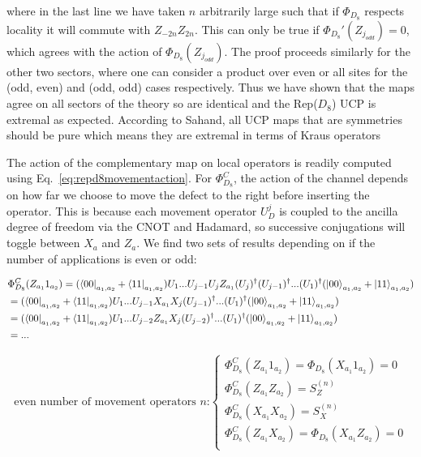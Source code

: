 \documentclass{article}
\theoremstyle{definition}
\begin{document}
where in the last line we have taken $n$ arbitrarily large such that if $\Phi_{D_8}$ respects locality it will commute with $Z_{-2n}Z_{2n}$.  This can only be true if $\Phi_{D_8}'(Z_{j_{odd}}) = 0$, which agrees with the action of $\Phi_{D_8}(Z_{j_{odd}})$.  The proof proceeds similarly for the other two sectors, where one can consider a product over even or all sites for the (odd, even) and (odd, odd) cases respectively.  Thus we have shown that the maps agree on all sectors of the theory so are identical and the Rep($D_8$) UCP is extremal as expected.
\color{brown}
According to Sahand, all UCP maps that are symmetries should be pure which means they are extremal in terms of Kraus operators
\color{black}


The action of the complementary map on local operators is readily computed using Eq.~\ref{eq:repd8movementaction}. For $\Phi^C_{D_8}$, the action of the channel depends on how far we choose to move the defect to the right before inserting the operator.  This is because each movement operator $U^j_{D}$ is coupled to the ancilla degree of freedom via the CNOT and Hadamard, so successive conjugations will toggle between $X_a$ and $Z_a$. We find two sets of results depending on if the number of applications is even or odd:

\color{blue}
\begin{align}
    &\Phi^C_{D_8}(Z_{a_1}1_{a_2}) = (\bra{00}_{a_1,a_2} + \bra{11}_{a_1,a_2}) U_1 ... U_{j-1} U_j Z_{a_1} (U_j)^\dagger (U_{j-1})^\dagger ... (U_{1})^\dagger (\ket{00}_{a_1,a_2} + \ket{11}_{a_1,a_2})\\
    &= (\bra{00}_{a_1,a_2} + \bra{11}_{a_1,a_2}) U_1 ...U_{j-1} X_{a_1}X_j (U_{j-1})^\dagger ... (U_{1})^\dagger (\ket{00}_{a_1,a_2} + \ket{11}_{a_1,a_2})\\
    &=  (\bra{00}_{a_1,a_2} + \bra{11}_{a_1,a_2}) U_1 ...U_{j-2}Z_{a_1}X_j(U_{j-2})^\dagger ... (U_{1})^\dagger (\ket{00}_{a_1,a_2} + \ket{11}_{a_1,a_2})\\
    &= ...
\end{align}

\color{black}

\begin{equation} \text{even number of movement operators $n$:}
\begin{cases}
    \Phi^C_{D_8}(Z_{a_1}1_{a_2}) = \Phi_{D_8}(X_{a_1}1_{a_2}) = 0\\
    \Phi^C_{D_8}(Z_{a_1}Z_{a_2}) = S_Z^{(n)}\\
    \Phi^C_{D_8}(X_{a_1}X_{a_2}) = S_X^{(n)}\\
    \Phi^C_{D_8}(Z_{a_1}X_{a_2}) = \Phi_{D_8}(X_{a_1}Z_{a_2}) = 0 \\
\end{cases}
\end{equation}
\end{document}
